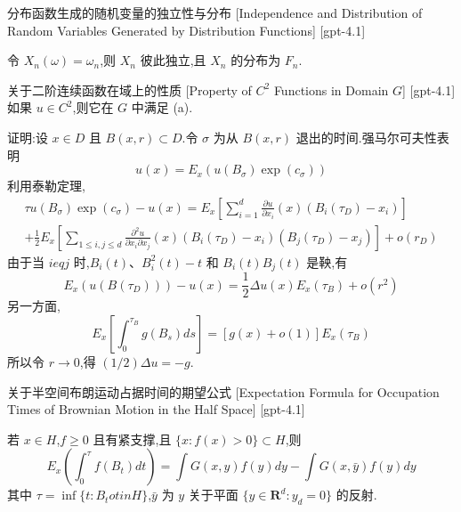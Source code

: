 \documentclass[UTF8]{ctexart}
\begin{document}
    
    
    \begin{ppt}
        {分布函数生成的随机变量的独立性与分布}
        [Independence and Distribution of Random Variables Generated by Distribution Functions]
        [gpt-4.1]
        
令 $X_{n}(\omega) = \omega_{n}$,则 $X_{n}$ 彼此独立,且 $X_{n}$ 的分布为 $F_{n}$.

    \end{ppt}
    
    
    
    \begin{thm}
        {关于二阶连续函数在域上的性质}
        [Property of $C^2$ Functions in Domain $G$]
        [gpt-4.1]
        如果 $
u \in C ^ { 2 }$,则它在 $G$ 中满足 (a).

证明:设 $x \in D$ 且 $B(x, r) \subset D$.令 $\sigma$ 为从 $B(x, r)$ 退出的时间.强马尔可夫性表明
\[
u(x) = E_x(
u(B_\sigma)\exp(c_\sigma))
\]
利用泰勒定理,
\[
\begin{array} { l }
  \displaystyle \tau 
u ( B _ { \sigma } ) \exp ( c _ { \sigma } ) - 
u ( x ) = E _ { x } \left[ \sum _ { i = 1 } ^ { d } \frac { \partial 
u } { \partial x _ { i } } ( x ) ( B _ { i } ( \tau _ { D } ) - x _ { i } ) \right] \\
  \displaystyle + \frac { 1 } { 2 } E _ { x } \left[ \sum _ { 1 \leq i , j \leq d } \frac { \partial ^ { 2 } 
u } { \partial x _ { i } \partial x _ { j } } ( x ) ( B _ { i } ( \tau _ { D } ) - x _ { i } ) ( B _ { j } ( \tau _ { D } ) - x _ { j } ) \right] + o ( r _ { D } )
\end{array}
\]
由于当 $i 
eq j$ 时,$B_i(t)$、$B_i^2(t) - t$ 和 $B_i(t)B_j(t)$ 是鞅,有
\[
E_x(
u(B(\tau_D))) - 
u(x) = \frac{1}{2} \Delta 
u(x) E_x(\tau_B) + o(r^2)
\]
另一方面,
\[
E_x\left[ \int_0^{\tau_B} g(B_s) ds \right] = [g(x) + o(1)] E_x(\tau_B)
\]
所以令 $r \to 0$,得 $(1/2)\Delta 
u = -g$.
    \end{thm}
    
    
    
    \begin{thm}
        {关于半空间布朗运动占据时间的期望公式}
        [Expectation Formula for Occupation Times of Brownian Motion in the Half Space]
        [gpt-4.1]
        
若 $x \in H$,$f \geq 0$ 且有紧支撑,且 $\{x : f(x) > 0\} \subset H$,则
\[
E_x\left(\int_0^{\tau} f(B_t) dt\right) = \int G(x, y) f(y) dy - \int G(x, \bar{y}) f(y) dy
\]
其中 $\tau = \inf\{t : B_t 
otin H\}$,$\bar{y}$ 为 $y$ 关于平面 $\{y \in \mathbf{R}^d : y_d = 0\}$ 的反射.

    \end{thm}
    
\end{document}
